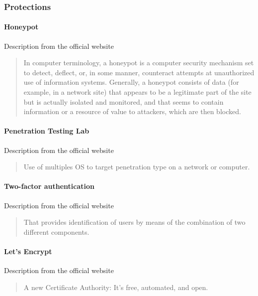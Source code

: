 
\subsubsection{Protections}

\paragraph{Honeypot}
Description from the official website \cite{Honeypot}
\blockquote{In computer terminology, a honeypot is a computer security mechanism set to detect, deflect, or, in some manner, counteract attempts at unauthorized use of information systems. Generally, a honeypot consists of data (for example, in a network site) that appears to be a legitimate part of the site but is actually isolated and monitored, and that seems to contain information or a resource of value to attackers, which are then blocked.}

\paragraph{Penetration Testing Lab}
Description from the official website \cite{PenetrationLab}
\blockquote{Use of multiples OS to target penetration type on a network or computer.}

\paragraph{Two-factor authentication}
Description from the official website \cite{Two-factorAuthentication}
\blockquote{That provides identification of users by means of the combination of two different components.}

\paragraph{Let's Encrypt}
Description from the official website \cite{LetsEncrypt}
\blockquote{A new Certificate Authority: It’s free, automated, and open.}

